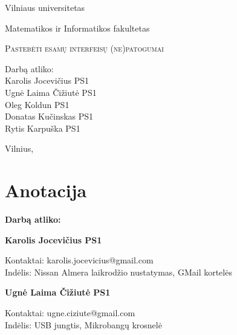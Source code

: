 ﻿\documentclass[a4paper, 12pt]{article}
\newcommand{\OK}{Oleg Koldun PS1}
\newcommand{\UC}{Ugnė Laima Čižiutė PS1}
\newcommand{\RK}{Rytis Karpuška PS1}
\newcommand{\DK}{Donatas Kučinskas PS1}
\newcommand{\KJ}{Karolis Jocevičius PS1}
\begin{document}


	\begin{titlepage}

		\begin{center}
	
			\large {Vilniaus universitetas
	
					Matematikos ir Informatikos fakultetas}
			
			\vspace*{\fill}
	
		\textsc{\Huge Pastebėti esamų interfeisų (ne)patogumai} \\[0.5cm]
	
		\vspace{3cm}
	
			\begin{flushright}
				\begin{minipage}{0.35\textwidth}
				{\large Darbą atliko:} \\
					\KJ \\
					\UC \\
					\OK \\
					\DK \\
					\RK
				\end{minipage}
			\end{flushright}
	
			\vspace{\fill}
	
			{\Large Vilnius, \the\year}
			
		\end{center}
	\end{titlepage}
	

\section{Anotacija}
	
		\textbf{Darbą atliko:}
		
		
		\textbf{\KJ}
		\begin{flushleft}
		\hspace*{1.5cm}
		Kontaktai:
			karolis.jocevicius@gmail.com
		\\
		\hspace*{1.5cm}
		Indėlis: Nissan Almera laikrodžio nustatymas, GMail kortelės 
		\end{flushleft}
		
		\textbf{\UC}
		\begin{flushleft}
		\hspace*{1.5cm}
		Kontaktai: 
			ugne.ciziute@gmail.com
		\\
		\hspace*{1.5cm}
		Indėlis: USB jungtis, Mikrobangų krosnelė
		\end{flushleft}
		
\end{document}
